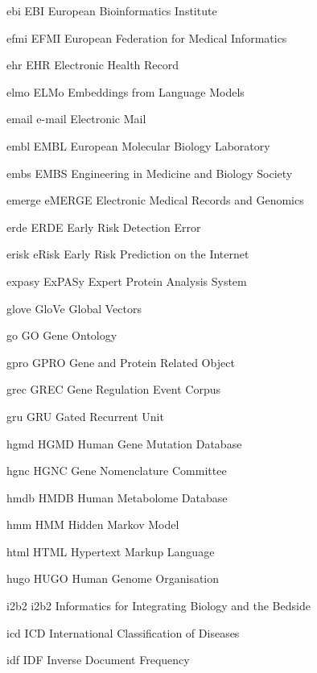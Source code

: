 \newabbreviation
{ebi}
{EBI}
{European Bioinformatics Institute}

\newabbreviation
{efmi}
{EFMI}
{European Federation for Medical Informatics}

\newabbreviation
{ehr}
{EHR}
{Electronic Health Record}

\newabbreviation
{elmo}
{ELMo}
{Embeddings from Language Models}

\newabbreviation
{email}
{e-mail}
{Electronic Mail}

\newabbreviation
{embl}
{EMBL}
{European Molecular Biology Laboratory}

\newabbreviation
{embs}
{EMBS}
{Engineering in Medicine and Biology Society}

\newabbreviation
{emerge}
{eMERGE}
{Electronic Medical Records and Genomics}

\newabbreviation
{erde}
{ERDE}
{Early Risk Detection Error}

\newabbreviation
{erisk}
{eRisk}
{Early Risk Prediction on the Internet}

\newabbreviation
{expasy}
{ExPASy}
{Expert Protein Analysis System}

\newabbreviation
{glove}
{GloVe}
{Global Vectors}

\newabbreviation
{go}
{GO}
{Gene Ontology}

\newabbreviation
{gpro}
{GPRO}
{Gene and Protein Related Object}

\newabbreviation
{grec}
{GREC}
{Gene Regulation Event Corpus}

\newabbreviation
{gru}
{GRU}
{Gated Recurrent Unit}

\newabbreviation
{hgmd}
{HGMD}
{Human Gene Mutation Database}

\newabbreviation
{hgnc}
{HGNC}
{ Gene Nomenclature Committee}

\newabbreviation
{hmdb}
{HMDB}
{Human Metabolome Database}

\newabbreviation
{hmm}
{HMM}
{Hidden Markov Model}

\newabbreviation
{html}
{HTML}
{Hypertext Markup Language}

\newabbreviation
{hugo}
{HUGO}
{Human Genome Organisation}

\newabbreviation
{i2b2}
{i2b2}
{Informatics for Integrating Biology and the Bedside}

\newabbreviation
{icd}
{ICD}
{International Classification of Diseases}

\newabbreviation
{idf}
{IDF}
{Inverse Document Frequency}

